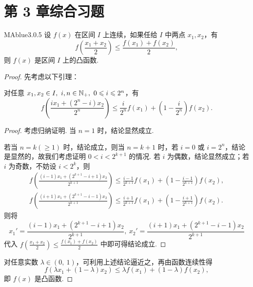 \section*{第 3 章综合习题}

\begin{problem}{MAblue}{3.0.5}
    设 $f(x)$ 在区间 $I$ 上连续，如果任给 $I$ 中两点 $x_1, x_2$，有
    \[
        f \left( \frac {x_1 + x_2} 2 \right) \leqslant \frac {f(x_1) + f(x_2)} 2,
    \]
    则 $f(x)$ 是区间 $I$ 上的凸函数.
\end{problem}

\begin{proof}
    先考虑以下引理：
    \begin{center}
        \begin{minipage}{0.9\textwidth}
            \begin{lemma}{}{}
                对任意 $x_1, x_2 \in I,\ i, n \in \mathbb N_+,\ 0 \leqslant i \leqslant 2^n$，有
                \[
                    f\left( \frac{ix_1+(2^n-i)x_2}{2^n} \right) \leqslant \frac i {2^n} f(x_1) + \left( 1 - \frac i {2^n} \right) f(x_2).
                \]
                \tcblower
                \begin{proof}
                    考虑归纳证明. 当 $n = 1$ 时，结论显然成立.

                    若当 $n = k (\geqslant 1)$ 时，结论成立，则当 $n = k + 1$ 时，若 $i = 0$ 或 $i = 2^n$，结论是显然的，故我们考虑证明 $0 < i < 2^{k+1}$ 的情况. 若 $i$ 为偶数，结论显然成立；若 $i$ 为奇数，不妨设 $i < 2^k$，则
                    \begin{align*}
                        f\left( \frac{(i-1)x_1+(2^{k+1}-i+1)x_2}{2^{k+1}} \right) \leqslant \frac {i-1} {2^{k+1}} f(x_1) + \left( 1 - \frac {i-1} {2^{k+1}} \right) f(x_2), \\
                        f\left( \frac{(i+1)x_1+(2^{k+1}-i-1)x_2}{2^{k+1}} \right) \leqslant \frac {i+1} {2^{k+1}} f(x_1) + \left( 1 - \frac {i+1} {2^{k+1}} \right) f(x_2).
                    \end{align*}
                    则将
                    \[
                        x_1' = \frac{(i-1)x_1+(2^{k+1}-i+1)x_2}{2^{k+1}},\ x_2' = \frac{(i+1)x_1+(2^{k+1}-i-1)x_2}{2^{k+1}}
                    \]
                    代入 $f\left( \frac {x_1+x_2} 2 \right) \leqslant \frac {f(x_1)+f(x_2)} 2$ 中即可得结论成立.
                \end{proof}
            \end{lemma}
        \end{minipage}
    \end{center}
    对任意实数 $\lambda \in (0,\ 1)$，可利用上述结论逼近之，再由函数连续性得
    \[
        f(\lambda x_1 + (1 - \lambda) x_2) \leqslant \lambda f(x_1) + (1 - \lambda) f(x_2),
    \]
    即 $f(x)$ 是凸函数.
\end{proof}

